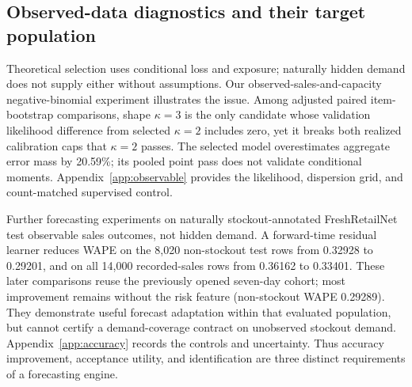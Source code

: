 \subsection{Observed-data diagnostics and their target population}
\label{app:natural-diagnostics}
Theoretical selection uses conditional loss and exposure; naturally hidden demand does not supply either without assumptions. Our observed-sales-and-capacity negative-binomial experiment illustrates the issue. Among adjusted paired item-bootstrap comparisons, shape $\kappa=3$ is the only candidate whose validation likelihood difference from selected $\kappa=2$ includes zero, yet it breaks both realized calibration caps that $\kappa=2$ passes. The selected model overestimates aggregate error mass by 20.59\%; its pooled point pass does not validate conditional moments. Appendix~\ref{app:observable} provides the likelihood, dispersion grid, and count-matched supervised control.

Further forecasting experiments on naturally stockout-annotated FreshRetailNet test observable sales outcomes, not hidden demand. A forward-time residual learner reduces WAPE on the 8,020 non-stockout test rows from 0.32928 to 0.29201, and on all 14,000 recorded-sales rows from 0.36162 to 0.33401. These later comparisons reuse the previously opened seven-day cohort; most improvement remains without the risk feature (non-stockout WAPE 0.29289). They demonstrate useful forecast adaptation within that evaluated population, but cannot certify a demand-coverage contract on unobserved stockout demand. Appendix~\ref{app:accuracy} records the controls and uncertainty. Thus accuracy improvement, acceptance utility, and identification are three distinct requirements of a forecasting engine.

